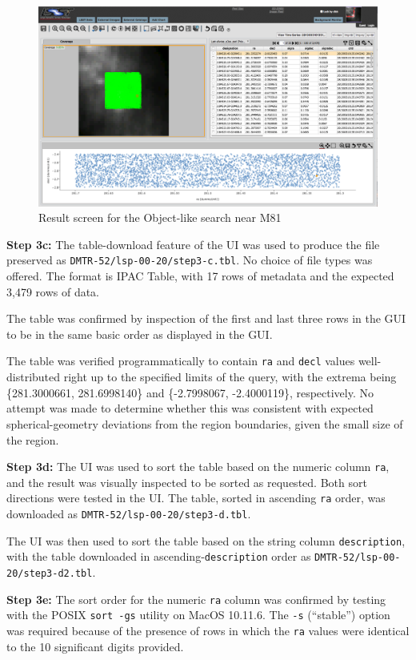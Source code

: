 \begin{figure}
  \includegraphics[width=\linewidth]{lsp-00-20/step3Result_a.png}
  \caption{Result screen for the Object-like search near M81}
  \label{fig:lsp-00-20-result-table}
\end{figure}

\textbf{Step 3c:} The table-download feature of the UI was used to produce the file preserved as \verb|DMTR-52/lsp-00-20/step3-c.tbl|.
No choice of file types was offered.
The format is IPAC Table, with 17 rows of metadata and the expected 3,479 rows of data.

The table was confirmed by inspection of the first and last three rows in the GUI to be in the same basic order as displayed in the GUI.

The table was verified programmatically to contain \verb|ra| and \verb|decl| values well-distributed right up to the specified limits of the query,
with the extrema being \{281.3000661, 281.6998140\} and \{-2.7998067, -2.4000119\},
respectively.
No attempt was made to determine whether this was consistent with expected spherical-geometry deviations from the region boundaries,
given the small size of the region.

\textbf{Step 3d:} The UI was used to sort the table based on the numeric column \verb|ra|,
and the result was visually inspected to be sorted as requested.
Both sort directions were tested in the UI.
The table, sorted in ascending \verb|ra| order, was downloaded as \verb|DMTR-52/lsp-00-20/step3-d.tbl|.

The UI was then used to sort the table based on the string column \verb|description|,
with the table downloaded in ascending-\verb|description| order as \verb|DMTR-52/lsp-00-20/step3-d2.tbl|.

\textbf{Step 3e:} The sort order for the numeric \verb|ra| column was confirmed by testing with the POSIX \texttt{sort -gs} utility on MacOS 10.11.6.
The \verb|-s| (``stable'') option was required because of the presence of rows in which the \verb|ra| values were identical to the 10 significant digits provided.

